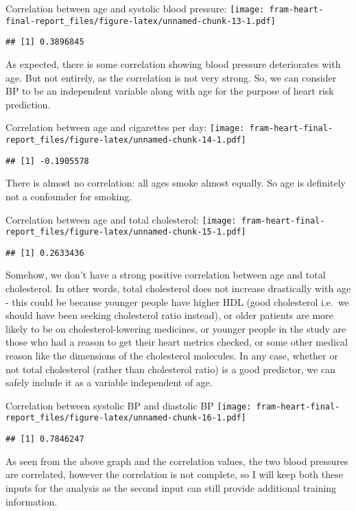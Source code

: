 \documentclass[]{article}
\begin{document}
Correlation between age and systolic blood pressure:
\texttt{[image: fram-heart-final-report\_files/figure-latex/unnamed-chunk-13-1.pdf]}

\begin{verbatim}
## [1] 0.3896845
\end{verbatim}

As expected, there is some correlation showing blood pressure
deteriorates with age. But not entirely, as the correlation is not very
strong. So, we can consider BP to be an independent variable along with
age for the purpose of heart risk prediction.

Correlation between age and cigarettes per day:
\texttt{[image: fram-heart-final-report\_files/figure-latex/unnamed-chunk-14-1.pdf]}

\begin{verbatim}
## [1] -0.1905578
\end{verbatim}

There is almost no correlation: all ages smoke almost equally. So age is
definitely not a confounder for smoking.

Correlation between age and total cholesterol:
\texttt{[image: fram-heart-final-report\_files/figure-latex/unnamed-chunk-15-1.pdf]}

\begin{verbatim}
## [1] 0.2633436
\end{verbatim}

Somehow, we don't have a strong positive correlation between age and
total cholesterol. In other words, total cholesterol does not increase
drastically with age - this could be because younger people have higher
HDL (good cholesterol i.e.~we should have been seeking cholesterol ratio
instead), or older patients are more likely to be on
cholesterol-lowering medicines, or younger people in the study are those
who had a reason to get their heart metrics checked, or some other
medical reason like the dimensions of the cholesterol molecules. In any
case, whether or not total cholesterol (rather than cholesterol ratio)
is a good predictor, we can safely include it as a variable independent
of age.

Correlation between systolic BP and diastolic BP
\texttt{[image: fram-heart-final-report\_files/figure-latex/unnamed-chunk-16-1.pdf]}

\begin{verbatim}
## [1] 0.7846247
\end{verbatim}

As seen from the above graph and the correlation values, the two blood
pressures are correlated, however the correlation is not complete, so I
will keep both these inputs for the analysis as the second input can
still provide additional training information.
\end{document}
